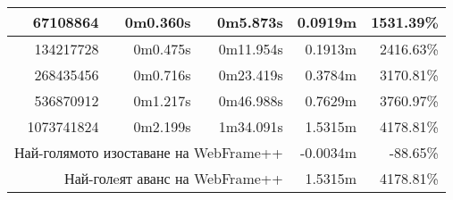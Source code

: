 \documentclass[documentation.tex]{subfiles}
\begin{document}
\begin{longtable}{|r|r|r|r|r|}
        67108864                                                                                                                  & 0m0.360s                        & 0m5.873s                                                                       & {\color[HTML]{32CB00} 0.0919m}                        & {\color[HTML]{32CB00} 1531.39\%}                       \\ \hline
        134217728                                                                                                                 & 0m0.475s                        & 0m11.954s                                                                      & {\color[HTML]{32CB00} 0.1913m}                        & {\color[HTML]{32CB00} 2416.63\%}                       \\ \hline
        268435456                                                                                                                 & 0m0.716s                        & 0m23.419s                                                                      & {\color[HTML]{32CB00} 0.3784m}                        & {\color[HTML]{32CB00} 3170.81\%}                       \\ \hline
        536870912                                                                                                                 & 0m1.217s                        & 0m46.988s                                                                      & {\color[HTML]{32CB00} 0.7629m}                        & {\color[HTML]{32CB00} 3760.97\%}                       \\ \hline
        1073741824                                                                                                                & 0m2.199s                        & 1m34.091s                                                                      & {\color[HTML]{32CB00} 1.5315m}                        & {\color[HTML]{32CB00} 4178.81\%}                       \\ \hline
        \multicolumn{3}{|r|}{Най-голямото изоставане на WebFrame++}                                                                                                                                                                                  & {\color[HTML]{FF0000} -0.0034m}                       & {\color[HTML]{FF0000} -88.65\%}                        \\ \hline
        \multicolumn{3}{|r|}{Най-голeят аванс на WebFrame++}                                                                                                                                                                                         & {\color[HTML]{32CB00} 1.5315m}                        & {\color[HTML]{32CB00} 4178.81\%}                       \\ \hline

\end{longtable}
\end{document}
